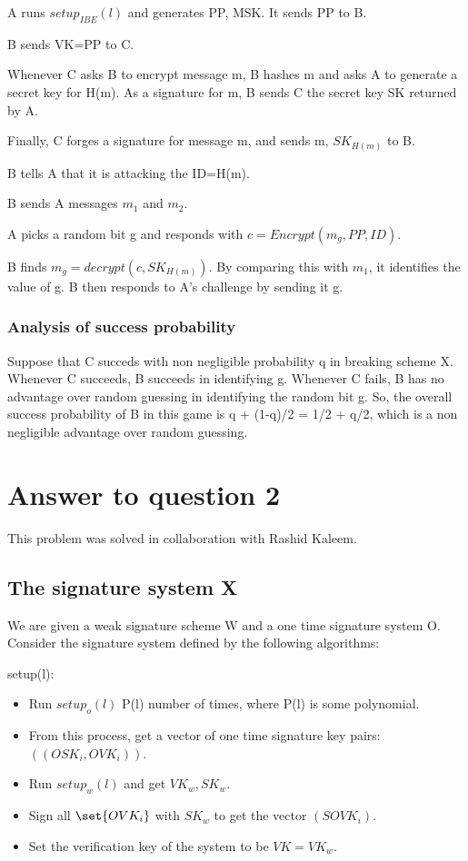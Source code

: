 \documentclass[10pt]{amsart}
\begin{document}
A runs $setup_{IBE}(l)$ and generates PP, MSK. It sends PP to B.

B sends VK=PP to C.

Whenever C asks B to encrypt message m, B hashes m and asks A to generate a secret key for H(m). As a signature for m, B sends C the secret key SK returned by A.

Finally, C forges a signature for message m, and sends m, $SK_{H(m)}$ to B.

B tells A that it is attacking the ID=H(m).

B sends A messages $m_{1}$ and $m_{2}$.

A picks a random bit g and responds with $c = Encrypt(m_g, PP, ID)$.

B finds $m_g = decrypt(c, SK_{H(m)})$. By comparing this with $m_{1}$, it identifies the value of g. B then responds to A's challenge by sending it g.

\subsubsection{Analysis of success probability}
Suppose that C succeds with non negligible probability q in breaking scheme X. Whenever C succeeds, B succeeds in identifying g. Whenever C fails, B has no advantage over random guessing in identifying the random bit g. So, the overall success probability of B in this game is q + (1-q)/2 = 1/2 + q/2, which is a non negligible advantage over random guessing.

\section{Answer to question 2}
\begin{ack}
 This problem was solved in collaboration with Rashid Kaleem.
\end{ack}


\subsection{The signature system X}
We are given a weak signature scheme W and a one time signature system O. Consider the signature system defined by the following algorithms:

setup(l):
\begin{itemize}
 \item Run $setup_o(l)$ P(l) number of times, where P(l) is some polynomial.
 \item From this process, get a vector of one time signature key pairs: \\
$((OSK_{i}, OVK_{i}))$.
 \item Run $setup_w(l)$ and get $VK_w, SK_w$.
 \item Sign all $\set{OVK_{i}}$ with $SK_w$ to get the vector $(SOVK_i)$.
 \item Set the verification key of the system to be $VK = VK_w$.
\end{itemize}
\end{document}
